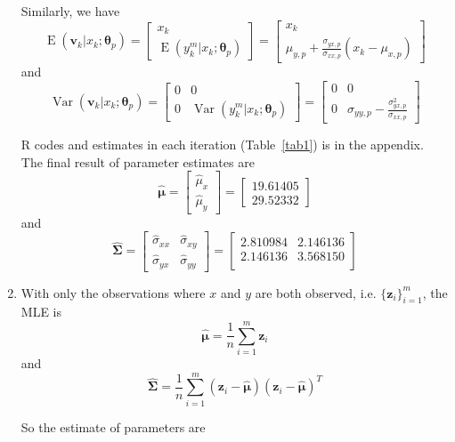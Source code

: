 \documentclass{article}
\DeclareMathOperator{\Var}{Var}
\DeclareMathOperator{\E}{E}
\begin{document}
\begin{enumerate}[font = \bfseries, leftmargin = 0 em]
		Similarly, we have
		\[\E(\bm v_k|x_k; \bm \theta_p) = \begin{bmatrix}
			x_k\\
			\E(y_k^m|x_k; \bm \theta_p)
		\end{bmatrix} = \begin{bmatrix}
			x_k\\
			\mu_{y,p} + \frac{\sigma_{yx,p}}{\sigma_{xx, p}}(x_k - \mu_{x,p})
		\end{bmatrix}\]
		and
		\[\Var(\bm v_k|x_k; \bm \theta_p) = \begin{bmatrix}
			0 & 0\\
			0&\Var(y_k^m|x_k;\bm \theta_p) 
		\end{bmatrix} = \begin{bmatrix}
			0 & 0\\
			0 & \sigma_{yy,p} - \frac{\sigma_{yx,p}^2}{\sigma_{xx,p}} 
		\end{bmatrix}\]

		R codes and estimates in each iteration (Table~\ref{tab1}) is in the appendix. The final result of parameter estimates are
		\[\hat{\bm \mu} = \begin{bmatrix}
			\hat{\mu}_x\\
			\hat{\mu}_y
		\end{bmatrix} = \begin{bmatrix}
              19.61405\\
               29.52332 
		\end{bmatrix}\]
		and 
		\[\hat{\bm \Sigma} = \begin{bmatrix}
			\hat{\sigma}_{xx} & \hat{\sigma}_{xy}\\
			\hat{\sigma}_{yx} & \hat{\sigma}_{yy}
		\end{bmatrix} = \begin{bmatrix}
2.810984& 2.146136\\
2.146136& 3.568150\\
		\end{bmatrix}\]

\newpage
		\item 
		With only the observations where $x$ and $y$ are both observed, i.e. $\{\bm z_i\}_{i=1}^m$, the MLE is
		\[\hat{\bm \mu} = \frac{1}{n} \sum_{i=1}^m \bm z_i\]
		and
		\[\hat{\bm \Sigma} = \frac{1}{n} \sum_{i=1}^m (\bm z_i - \hat{\bm \mu})(\bm z_i - \hat{\bm \mu})^T\]

		So the estimate of parameters are


\end{enumerate}
\end{document}
